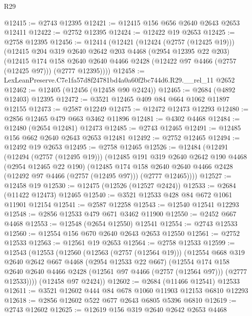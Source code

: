 \begin{lexlean}{R29}
\begin{coremodule}
@12415 := @2743 @12395
@12421 := @12415 @156 @656 @2640 @2643 @2653 @12411
@12422 := @2752 @12395
@12424 := @12422 @19 @2653
@12425 := @2758 @12395
@12456 := @12414
    (@12421
      (@12424 (@2757 (@12425 @19)))
      (@12415
        @204
        @319
        @2640
        @2642
        @203
        @4468
        (@2954 @12395 @22 @203)
        (@12415
          @174
          @158
          @2640
          @2640
          @4466
          @2428
          (@12422 @97 @4466 (@2757 (@12425 @97)))
          (@2777 @12395))))
@12458 := LexLeanPreserve.C7e1fa57d8f24781bd4a0a60f2bc744d6.R29.__rel_11 @2652
@12462 := @12405 (@12456 (@12458 @90 @2424))
@12465 := @2684 (@4892 @12403) @12395
@12472 := @3521 @12465 @409 @84 @664 @1062 @11897 @12155
@12473 := @2587 @12249
@12475 := @12472 @12473 @12293
@12480 := @2856 @12465 @479 @663 @3462 @11896
@12481 := @4302 @4468
@12484 := @12480 (@2654 @12481) @12473
@12485 := @2743 @12465
@12491 := @12485 @156 @662 @2640 @2643 @2653 @12481
@12492 := @2752 @12465
@12494 := @12492 @19 @2653
@12495 := @2758 @12465
@12526 := @12484
    (@12491
      (@12494 (@2757 (@12495 @19)))
      (@12485
        @191
        @319
        @2640
        @2642
        @190
        @4468
        (@2954 @12465 @22 @190)
        (@12485
          @174
          @158
          @2640
          @2640
          @4466
          @2428
          (@12492 @97 @4466 (@2757 (@12495 @97)))
          (@2777 @12465))))
@12527 := @12458 @19
@12530 := @12475 (@12526 (@12527 @2424))
@12533 := @2684 (@11422 @12473) @12465
@12540 := @3521 @12533 @428 @84 @672 @1061 @11901 @12154
@12541 := @2587 @12258
@12543 := @12540 @12541 @12293
@12548 := @2856 @12533 @479 @671 @3462 @11900
@12550 := @2452 @667 @4468
@12553 := @12548 (@2654 @12550) @12541
@12554 := @2743 @12533
@12560 := @12554 @156 @670 @2640 @2643 @2653 @12550
@12561 := @2752 @12533
@12563 := @12561 @19 @2653
@12564 := @2758 @12533
@12599 := @12543
    (@12553
      (@12560
        (@12563 (@2757 (@12564 @19)))
        (@12554
          @668
          @319
          @2640
          @2642
          @667
          @4468
          (@2954 @12533 @22 @667)
          (@12554
            @174
            @158
            @2640
            @2640
            @4466
            @2428
            (@12561 @97 @4466 (@2757 (@12564 @97)))
            (@2777 @12533))))
      (@12458 @97 @2424))
@12602 := @2684 (@11466 @12541) @12533
@12611 := @3521 @12602 @444 @84 @678 @1060 @11903 @12153 @6810 @12293
@12618 := @2856 @12602 @522 @677 @2643 @6805 @5396 @6810
@12619 := @2743 @12602
@12625 := @12619 @156 @319 @2640 @2642 @2653 @4468

\end{coremodule}
\end{lexlean}
